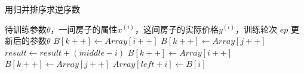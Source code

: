 \documentclass[11pt]{ctexart}
\begin{document}
	\begin{algorithm}
		\caption{用归并排序求逆序数}
		\begin{algorithmic}[1] %
			\Require 待训练参数$\theta$，一间房子的属性$x^{(i)}$，这间房子的实际价格$ y^{(i)} $，训练轮次 $ ep $
			\Ensure 更新后的参数$\theta$
			\State $B[k++]\gets Array[i++]$
			\Else
			\State $B[k++] \gets Array[j++]$
			\State $result \gets result + (middle - i)$
			\EndIf
			\EndWhile
			\State $B[k++] \gets Array[i++]$
			\EndWhile
			\State $B[k++] \gets Array[j++]$
			\EndWhile
			\State $Array[left + i] \gets B[i]$
			\EndFor
			\State {}
		\end{algorithmic}
	\end{algorithm}
\end{document}

